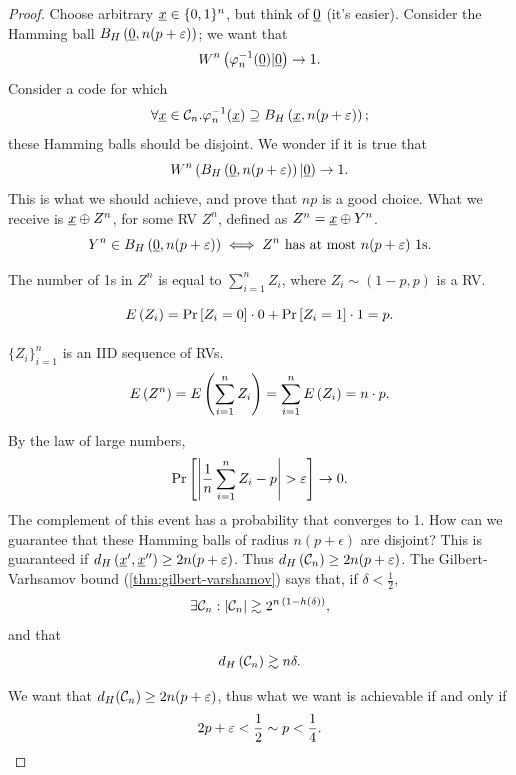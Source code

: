\begin{proof}
	Choose arbitrary $\str{x} \in \{0, 1\}^n$, but think of $\zero$ (it's easier).
	Consider the Hamming ball $\hball{\zero}{n(p+\epsilon)}$; we want that
	\begin{equation*}
		W^n \left( \phi^{-1}_n(\zero) | \zero \right) \to 1.
	\end{equation*}
	Consider a code for which
	\begin{equation*}
		\forall \str{x} \in \C_n .
		\phi^{-1}_n(\str{x}) \supseteq \hball{\str{x}}{n(p+\epsilon)};
	\end{equation*}
	these Hamming balls should be disjoint.
	We wonder if it is true that
	\begin{equation*}
		W^n \left( \hball{\zero}{n(p+\epsilon)} | \zero \right) \to 1.
	\end{equation*}
	This is what we should achieve, and prove that $np$ is a good choice.
	What we receive is $\str{x} \xor Z^n$, for some \ac{RV} $Z^n$, defined as $Z^n = \str{x} \xor Y^n$.
	\begin{equation*}
		Y^n \in \hball{\zero}{n(p+\epsilon)} \iff Z^n \text{ has at most } n(p+\epsilon) \text{ 1s}. 
	\end{equation*}

	The number of 1s in $Z^n$ is equal to $\sum_{i = 1}^{n} Z_i$, where $Z_i \sim (1-p, p)$ is a \ac{RV}.

	\begin{equation*}
		\expectation{Z_i} = \Pr{Z_i = 0} \cdot 0 + \Pr{Z_i = 1} \cdot 1 = p.
	\end{equation*}

	$\{Z_i\}_{i=1}^n$ is an \ac{IID} sequence of \acp{RV}.
	\begin{equation*}
		\expectation{Z^n} =
		\expectation{\sum_{i = 1}^{n} Z_i} =
		\sum_{i = 1}^{n} \expectation{Z_i} =
		n \cdot p.
	\end{equation*}

	By the law of large numbers,
	\begin{equation*}
		\Pr{\abs{\frac{1}{n} \sum_{i = 1}^{n} Z_i - p} > \epsilon} \to 0.
	\end{equation*}
	The complement of this event has a probability that converges to 1.
	How can we guarantee that these Hamming balls of radius $n(p+\epsilon)$ are disjoint?
	This is guaranteed if $\hdist{\str{x}',\str{x}''} \ge 2n (p+\epsilon)$.
	Thus $\hdist{\C_n} \ge 2n(p+\epsilon)$.
	The Gilbert-Varhsamov bound (\cref{thm:gilbert-varshamov}) says that, if $\delta < \frac{1}{2}$,
	\begin{equation*}
		\exists \C_n : \abs{\C_n} \gtrsim 2^{n \, (1-\entropy{\delta})},
	\end{equation*}
	and that
	\begin{equation*}
		\hdist{\C_n} \gtrsim n \delta.
	\end{equation*}

	We want that $d_H(\C_n) \ge 2n(p+\epsilon)$, thus what we want is achievable if and only if
	\begin{equation*}
		2p + \epsilon < \dfrac{1}{2} \sim p < \dfrac{1}{4}. \qedhere
	\end{equation*}
\end{proof}

